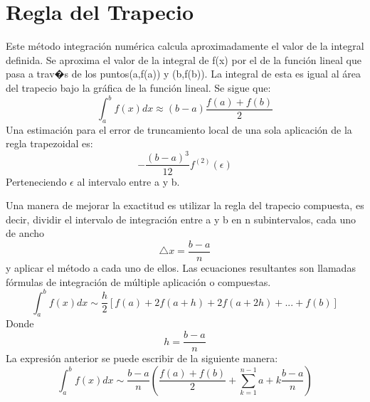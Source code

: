 


\section{Regla del Trapecio}
\label{2:sec:1}
\parindent=0.5cm
\raggedright
Este método integración numérica calcula aproximadamente el valor de la integral definida. 
Se aproxima el valor de la integral de f(x) por el de la función lineal que pasa 
a trav�s de los puntos(a,f(a)) y (b,f(b)). La integral de esta es igual al área del 
trapecio bajo la gráfica de la función lineal. Se sigue que: 
\[
\int_{a}^{b} f(x)dx \approx\left(b-a\right)\frac{f(a)+f(b)}{2} 
\]
Una estimación para el error de truncamiento local de una sola aplicación de la regla trapezoidal es:
\[
-\frac{\left(b-a\right)^3}{12}  \displaystyle f^{(2)}(\epsilon)
\]
Perteneciendo $\epsilon$ al intervalo entre a y b.


\parindent=0.5cm
\raggedright
Una manera de mejorar la exactitud es utilizar la regla del trapecio compuesta, es decir, dividir
el intervalo de integración entre a y b en n subintervalos, cada uno de ancho
\[
\bigtriangleup{x}=\frac{b-a}{n}
\]
y aplicar el método a cada uno de ellos. Las ecuaciones resultantes son llamadas fórmulas
de integración de múltiple aplicación o compuestas.
\[
\int_{a}^{b} f(x)dx \sim\frac{h}{2}\left[f(a) + 2f(a+h) + 2f(a+2h) + ... + f(b)\right]
\]
Donde 
\[
h=\frac{b-a}{n} 
\]
La expresión anterior se puede escribir de la siguiente manera:
\[
\int_{a}^{b} f(x)dx \sim\frac{b-a}{n}\left(\frac{f(a)+f(b)}{2} + \sum_{k=1}^{n-1} a+k\frac{b-a}{n} \right)
\]
